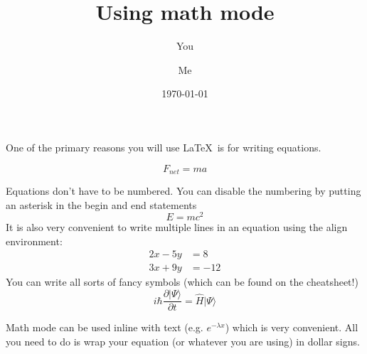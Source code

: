 \documentclass[a4paper]{article}
\begin{document}
\title{Using math mode}
\author{You \and Me}
\date{\today}
\maketitle

One of the primary reasons you will use \LaTeX \ is for writing equations.  

\begin{equation}
F_{net}=ma
\end{equation}

Equations don't have to be numbered. You can disable the numbering by putting an asterisk in the begin and end statements 
\begin{equation*}
E=mc^{2}
\end{equation*}
It is also very convenient to write multiple lines in an equation using the align environment:
\begin{align*}
2x - 5y &=  8 \\ 
3x + 9y &=  -12
\end{align*}
You can write all sorts of fancy symbols (which can be found on the cheatsheet!)
\begin{equation*}
i\hbar \frac{\partial | \Psi \rangle}{ \partial t}=\hat{H}|\Psi \rangle
\end{equation*}

Math mode can be used inline with text (e.g. $e^{-\lambda x}$) which is very convenient. All you need to do is wrap your equation (or whatever you are using) in dollar signs.  
\end{document}
